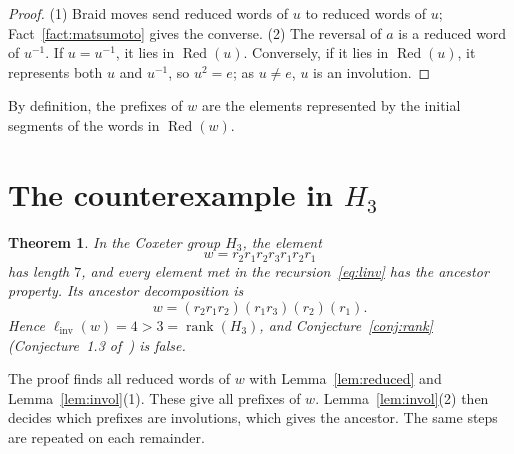 \documentclass[11pt]{amsart}
\newtheorem{theorem}{Theorem}[section]
\theoremstyle{definition}\newtheorem{definition}[theorem]{Definition}
\theoremstyle{remark}\newtheorem{remark}[theorem]{Remark}
\newcommand{\linv}{\ell_{\mathrm{inv}}}
\DeclareMathOperator{\Red}{Red}
\DeclareMathOperator{\rank}{rank}
\begin{document}
\begin{proof}
(1) Braid moves send reduced words of \(u\) to reduced words of \(u\); Fact~\ref{fact:matsumoto} gives the converse. (2) The reversal of \(a\) is a reduced word of \(u^{-1}\). If \(u=u^{-1}\), it lies in \(\Red(u)\). Conversely, if it lies in \(\Red(u)\), it represents both \(u\) and \(u^{-1}\), so \(u^2=e\); as \(u\neq e\), \(u\) is an involution.
\end{proof}

By definition, the prefixes of \(w\) are the elements represented by the initial segments of the words in \(\Red(w)\).

\section{The counterexample in \texorpdfstring{\(H_3\)}{H3}}\label{sec:h3}

\begin{theorem}\label{thm:h3}
In the Coxeter group \(H_3\), the element
\[
w=r_2r_1r_2r_3r_1r_2r_1
\]
has length \(7\), and every element met in the recursion~\eqref{eq:linv} has the ancestor property. Its ancestor decomposition is
\begin{equation}\label{eq:decomp}
w=(r_2r_1r_2)(r_1r_3)(r_2)(r_1).
\end{equation}
Hence \(\linv(w)=4>3=\rank(H_3)\), and Conjecture~\ref{conj:rank} (Conjecture~1.3 of~\cite{HR}) is false.
\end{theorem}

The proof finds all reduced words of \(w\) with Lemma~\ref{lem:reduced} and Lemma~\ref{lem:invol}(1). These give all prefixes of \(w\). Lemma~\ref{lem:invol}(2) then decides which prefixes are involutions, which gives the ancestor. The same steps are repeated on each remainder.
\end{document}
